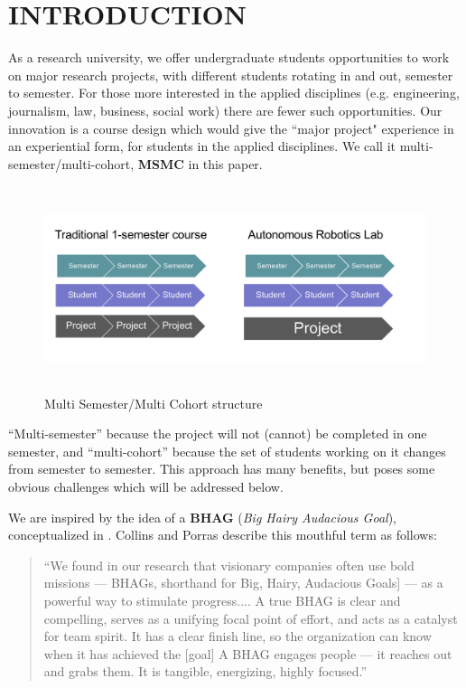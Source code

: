 \section{INTRODUCTION}

As a research university, we offer undergraduate students opportunities to work on major research projects, with different students rotating in and out, semester to semester. For those more interested in the applied disciplines (e.g. engineering, journalism, law, business, social work) there are fewer such opportunities. Our innovation is a course design which would give the ``major project" experience in an experiential form, for students in the applied disciplines. We call it multi-semester/multi-cohort, \textbf{MSMC} in this paper.

\begin{figure}[!ht]
  \centering
  \includegraphics[width=\columnwidth,height=6cm]{diag1}
  \caption{Multi Semester/Multi Cohort structure}
  \label{fig:diag1}
\end{figure}

``Multi-semester'' because the project will not (cannot) be completed in one semester, and ``multi-cohort'' because the set of students working on it changes from semester to semester. This approach has many benefits, but poses some obvious challenges which will be addressed below.

We are inspired by the idea of a \textbf{BHAG} (\textit{Big Hairy Audacious Goal}), conceptualized in \cite{Collins}. Collins and Porras describe this mouthful term as follows:

\begin{quote}
``We found in our research that visionary companies often use bold missions --- BHAGs, shorthand for Big, Hairy, Audacious Goals] --- as a powerful way to stimulate progress.... A true BHAG is clear and compelling, serves as a unifying focal point of effort, and acts as a catalyst for team spirit. It has a clear finish line, so the organization can know when it has achieved the [goal] A BHAG engages people --- it reaches out and grabs them. It is tangible, energizing, highly focused.\cite{Collins}''
\end{quote}

